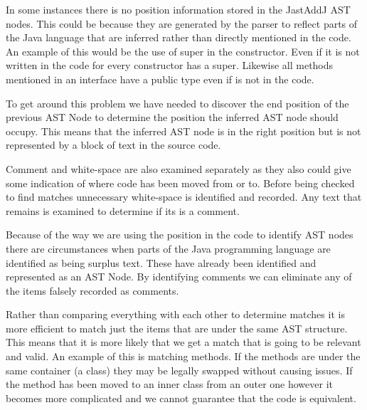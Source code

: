 
In some instances there is no position information stored in the JastAddJ AST nodes.  This could be because they are generated by the parser to reflect parts of the Java language that are inferred rather than directly mentioned in the code.  An example of this would be the use of super in the constructor.  Even if it is not written in the code for every constructor has a super. Likewise all methods mentioned in an interface have a public type even if is not in the code.

To get around this problem we have needed to discover the end position of the previous AST Node to determine the position the inferred AST node should occupy.  This means that the inferred AST node is in the right position but is not represented by a block of text in the source code. 

Comment and white-space are also examined separately as they also could give some indication of where code has been moved from or to.
Before being checked to find matches unnecessary white-space is identified and recorded.
Any text that remains is examined to determine if its is a comment. 

Because of the way we are using the position in the code to identify AST nodes there are circumstances when parts of the Java programming language are identified as being surplus text. These have already been identified and represented as an AST Node. By identifying comments we can eliminate any of the items falsely recorded as comments.


% 
% 

Rather than comparing everything with each other to determine matches it is more efficient to match just the items that are under the same AST structure.  This means that it is more likely that we get a match that is going to be relevant and valid.  An example of this is matching methods. If the methods are under the same container (a class) they may be legally swapped without causing issues.  If the method has been moved to an inner class from an outer one however it becomes more complicated and we cannot guarantee that the code is equivalent.  

